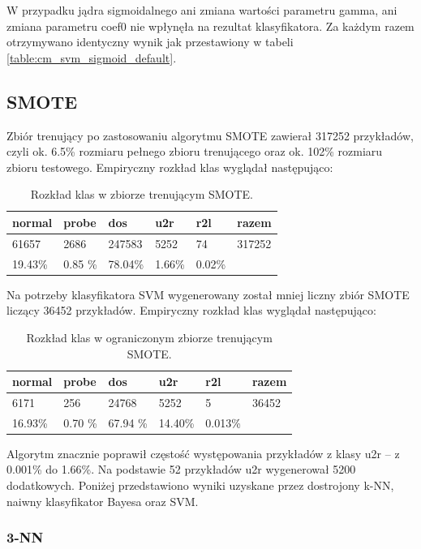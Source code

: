 \documentclass[a4paper, 12pt]{article}
\begin{document}
W przypadku jądra sigmoidalnego ani zmiana wartości parametru gamma, ani zmiana parametru coef0 nie wpłynęła na rezultat klasyfikatora. Za każdym razem otrzymywano identyczny wynik jak przestawiony w tabeli \ref{table:cm_svm_sigmoid_default}.

\subsection{SMOTE}
\label{smote}

Zbiór trenujący po zastosowaniu algorytmu SMOTE zawierał 317252 przykładów, 
czyli ok. 6.5\% rozmiaru pełnego zbioru trenującego oraz ok. 102\% rozmiaru
zbioru testowego. Empiryczny rozkład klas wyglądał następująco:

\begin{table}[H]
\centering
	\begin{tabular}{ | l | l | l | l | l | l | } \hline
		normal & probe & dos & u2r & r2l & razem \\ \hline
		61657 & 2686 & 247583 & 5252 & 74 & 317252 \\ \hline
		19.43\% & 0.85 \% & 78.04\% & 1.66\%  & 0.02\% & \\ \hline
	\end{tabular}
\caption{Rozkład klas w zbiorze trenującym SMOTE.}
\label{table:test}
\end{table}

Na potrzeby klasyfikatora SVM wygenerowany został mniej liczny zbiór SMOTE liczący 36452 przykładów. Empiryczny rozkład klas wyglądał następująco:
\begin{table}[H]
\centering
	\begin{tabular}{ | l | l | l | l | l | l | } \hline
		normal & probe & dos & u2r & r2l & razem \\ \hline
		6171 & 256 & 24768 & 5252 & 5 & 36452 \\ \hline
		16.93\% & 0.70 \% & 67.94 \% & 14.40\%  & 0.013\% & \\ \hline
	\end{tabular}
\caption{Rozkład klas w ograniczonym zbiorze trenującym SMOTE.}
\label{table:test}
\end{table}

Algorytm znacznie poprawił częstość występowania przykładów z klasy u2r -- z 0.001\% do 1.66\%.
Na podstawie 52 przykładów u2r wygenerował 5200 dodatkowych.
Poniżej przedstawiono wyniki uzyskane przez dostrojony k-NN, naiwny klasyfikator Bayesa oraz SVM. 

\subsubsection{3-NN}
\end{document}
